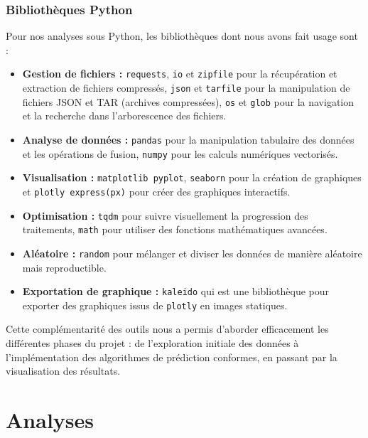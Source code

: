 \documentclass[a4paper,12pt]{article}
\begin{document}
\subsubsection{Bibliothèques Python}

Pour nos analyses sous Python, les bibliothèques dont nous avons fait usage sont :
\begin{itemize}
    \item \textbf{Gestion de fichiers :} \texttt{requests}, \texttt{io}  et \texttt{zipfile} pour la récupération et extraction de fichiers compressés, \texttt{json} et \texttt{tarfile} pour la manipulation de fichiers JSON et TAR (archives compressées), \texttt{os} et \texttt{glob} pour la navigation et la recherche dans l'arborescence des fichiers.
    \item \textbf{Analyse de données :} \texttt{pandas} pour la manipulation tabulaire des données et les opérations de fusion, \texttt{numpy} pour les calculs numériques vectorisés.
    \item \textbf{Visualisation :} \texttt{matplotlib pyplot}, \texttt{seaborn} pour la création de graphiques et \texttt{plotly express(px)} pour créer des graphiques interactifs.
    \item \textbf{Optimisation :} \texttt{tqdm} pour suivre visuellement la progression des traitements, \texttt{math} pour utiliser des fonctions mathématiques avancées.
    \item \textbf{Aléatoire :} \texttt{random} pour mélanger et diviser les données de manière aléatoire mais reproductible.
    \item \textbf{Exportation de graphique :} \texttt{kaleido} qui est une bibliothèque pour exporter des graphiques issus de \texttt{plotly} en images statiques.
\end{itemize}

\vspace{0.2cm}

Cette complémentarité des outils nous a permis d'aborder efficacement les différentes phases du projet : de l'exploration initiale des données à l'implémentation des algorithmes de prédiction conformes, en passant par la visualisation des résultats.


\section{Analyses}
\end{document}

